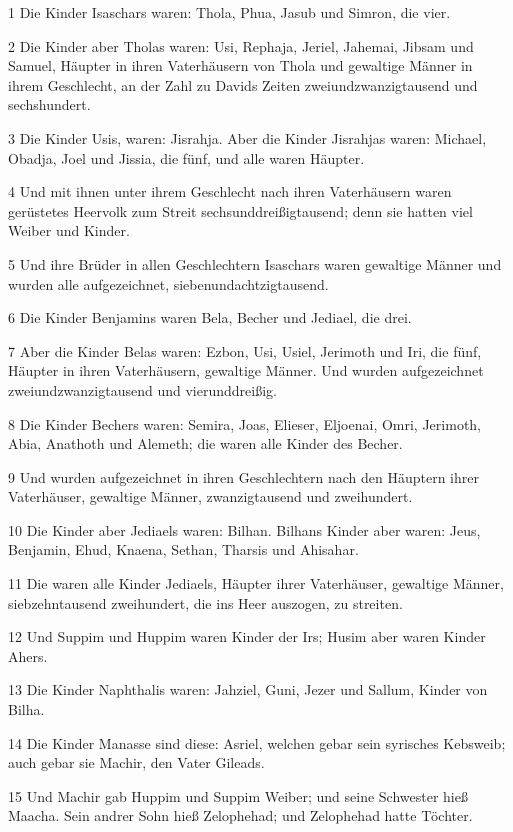 \par 1 Die Kinder Isaschars waren: Thola, Phua, Jasub und Simron, die vier.
\par 2 Die Kinder aber Tholas waren: Usi, Rephaja, Jeriel, Jahemai, Jibsam und Samuel, Häupter in ihren Vaterhäusern von Thola und gewaltige Männer in ihrem Geschlecht, an der Zahl zu Davids Zeiten zweiundzwanzigtausend und sechshundert.
\par 3 Die Kinder Usis, waren: Jisrahja. Aber die Kinder Jisrahjas waren: Michael, Obadja, Joel und Jissia, die fünf, und alle waren Häupter.
\par 4 Und mit ihnen unter ihrem Geschlecht nach ihren Vaterhäusern waren gerüstetes Heervolk zum Streit sechsunddreißigtausend; denn sie hatten viel Weiber und Kinder.
\par 5 Und ihre Brüder in allen Geschlechtern Isaschars waren gewaltige Männer und wurden alle aufgezeichnet, siebenundachtzigtausend.
\par 6 Die Kinder Benjamins waren Bela, Becher und Jediael, die drei.
\par 7 Aber die Kinder Belas waren: Ezbon, Usi, Usiel, Jerimoth und Iri, die fünf, Häupter in ihren Vaterhäusern, gewaltige Männer. Und wurden aufgezeichnet zweiundzwanzigtausend und vierunddreißig.
\par 8 Die Kinder Bechers waren: Semira, Joas, Elieser, Eljoenai, Omri, Jerimoth, Abia, Anathoth und Alemeth; die waren alle Kinder des Becher.
\par 9 Und wurden aufgezeichnet in ihren Geschlechtern nach den Häuptern ihrer Vaterhäuser, gewaltige Männer, zwanzigtausend und zweihundert.
\par 10 Die Kinder aber Jediaels waren: Bilhan. Bilhans Kinder aber waren: Jeus, Benjamin, Ehud, Knaena, Sethan, Tharsis und Ahisahar.
\par 11 Die waren alle Kinder Jediaels, Häupter ihrer Vaterhäuser, gewaltige Männer, siebzehntausend zweihundert, die ins Heer auszogen, zu streiten.
\par 12 Und Suppim und Huppim waren Kinder der Irs; Husim aber waren Kinder Ahers.
\par 13 Die Kinder Naphthalis waren: Jahziel, Guni, Jezer und Sallum, Kinder von Bilha.
\par 14 Die Kinder Manasse sind diese: Asriel, welchen gebar sein syrisches Kebsweib; auch gebar sie Machir, den Vater Gileads.
\par 15 Und Machir gab Huppim und Suppim Weiber; und seine Schwester hieß Maacha. Sein andrer Sohn hieß Zelophehad; und Zelophehad hatte Töchter.
